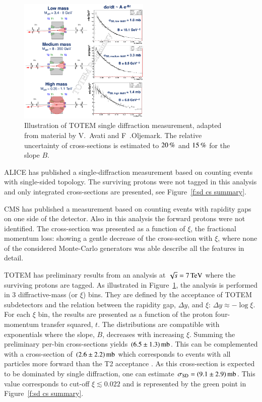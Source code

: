 \documentclass{webofc}
\def\un#1{\,{\rm #1}}
\begin{document}
\begin{figure}[h]
\centering
\includegraphics[height=6cm,clip]{fig/sd_7TeV.png}
\vskip-4mm
\caption{Illustration of TOTEM single diffraction measurement, adapted from material by V.~Avati and F~.Oljemark. The relative uncertainty of cross-sections is estimated to $20\un{\%}$ and $15\un{\%}$ for the slope $B$.}
\label{f:sd TOTEM}
\end{figure}

ALICE has published \cite{alice-inel-sd-dd} a single-diffraction measurement based on counting events with single-sided topology. The surviving protons were not tagged in this analysis and only integrated cross-sections are presented, see Figure~\ref{f:sd cs summary}.

CMS has published \cite{cms-diff-7tev} a measurement based on counting events with rapidity gaps on one side of the detector. Also in this analysis the forward protons were not identified. The cross-section was presented as a function of $\xi$, the fractional momentum loss: showing a gentle decrease of the cross-section with $\xi$, where none of the considered Monte-Carlo generators was able describe all the features in detail.

TOTEM has preliminary results \cite{totem-sd-7tev-prelim} from an analysis at $\sqrt s = 7\un{TeV}$ where the surviving protons are tagged. As illustrated in Figure~\ref{f:sd TOTEM}, the analysis is performed in 3 diffractive-mass (or $\xi$) bins. They are defined by the acceptance of TOTEM subdetectors and the relation between the rapidity gap, $\Delta y$, and $\xi$: $\Delta y \approx -\log\xi$. For each $\xi$ bin, the results are presented as a function of the proton four-momentum transfer squared, $t$. The distributions are compatible with exponentials where the slope, $B$, decreases with increasing $\xi$. Summing the preliminary per-bin cross-sections yields $(6.5\pm 1.3)\un{mb}$. This can be complemented with a cross-section of $(2.6\pm 2.2)\un{mb}$ which corresponds to events with all particles more forward than the T2 acceptance \cite{totem-si-inel-7tev}. As this cross-section is expected to be dominated by single diffraction, one can estimate $\sigma_{\rm SD} = (9.1 \pm 2.9)\un{mb}$. This value corresponds to cut-off $\xi \lesssim 0.022$ and is represented by the green point in Figure~\ref{f:sd cs summary}.
\end{document}
